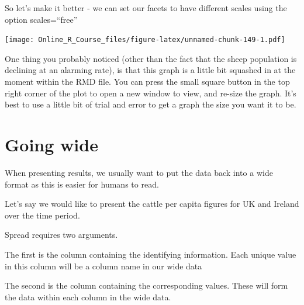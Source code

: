 \documentclass[]{book}
\newenvironment{Shaded}{\begin{snugshade}}{\end{snugshade}}
\newcommand{\DataTypeTok}[1]{\textcolor[rgb]{0.13,0.29,0.53}{#1}}
\newcommand{\KeywordTok}[1]{\textcolor[rgb]{0.13,0.29,0.53}{\textbf{#1}}}
\newcommand{\NormalTok}[1]{#1}
\newcommand{\OperatorTok}[1]{\textcolor[rgb]{0.81,0.36,0.00}{\textbf{#1}}}
\newcommand{\StringTok}[1]{\textcolor[rgb]{0.31,0.60,0.02}{#1}}
\begin{document}
So let's make it better - we can set our facets to have different scales using the option scales=``free''

\begin{Shaded}
\end{Shaded}

\texttt{[image: Online\_R\_Course\_files/figure-latex/unnamed-chunk-149-1.pdf]}

One thing you probably noticed (other than the fact that the sheep population is declining at an alarming rate), is that this graph is a little bit squashed in at the moment within the RMD file. You can press the small square button in the top right corner of the plot to open a new window to view, and re-size the graph. It's best to use a little bit of trial and error to get a graph the size you want it to be.

\hypertarget{going-wide}{%
\section{Going wide}\label{going-wide}}

When presenting results, we usually want to put the data back into a wide format as this is easier for humans to read.

Let's say we would like to present the cattle per capita figures for UK and Ireland over the time period.

Spread requires two arguments.

The first is the column containing the identifying information. Each unique value in this column will be a column name in our wide data

The second is the column containing the corresponding values. These will form the data within each column in the wide data.

\begin{Shaded}
\end{Shaded}
\end{document}
